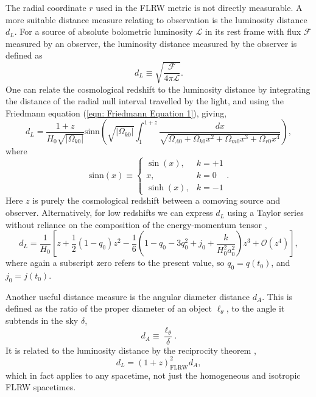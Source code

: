 \documentclass[a4paper,12pt]{report}
\begin{document}
The radial coordinate $r$ used in the FLRW metric is not directly measurable. A more suitable distance measure relating to observation is the luminosity distance $d_L$. For a source of absolute bolometric luminosity $\mathcal{L}$ in its rest frame with flux $\mathcal{F}$ measured by an observer, the luminosity distance measured by the observer is defined as
\begin{equation}
  d_L \equiv \sqrt{\frac{\mathcal{F}}{4\pi\mathcal{L}}}.
\end{equation}
One can relate the cosmological redshift to the luminosity distance by integrating the distance of the radial null interval travelled by the light, and using the Friedmann equation (\ref{eqn: Friedmann Equation 1}), giving,
\begin{equation}
  d_L = \frac{1+z}{H_0 \sqrt{|\Omega_{{k0}}|}}\text{sinn}\left(\sqrt{|\Omega_{{k0}}|} \int_1^{1+z} \frac{dx}{\sqrt{\Omega_{\Lambda 0} + \Omega_{k0}x^2 + \Omega_{m0}x^3 + \Omega_{r0}x^4}}\right),
\end{equation}
where
\begin{equation}
  \text{sinn}(x)\equiv \begin{cases}
    \sin (x), & k=+1 \\
    x, & k=0\\
    \sinh (x), & k=-1
\end{cases}.
\end{equation}
Here $z$ is purely the cosmological redshift between a comoving source and observer. Alternatively, for low redshifts we can express $d_L$ using a Taylor series without reliance on the composition of the energy-momentum tensor \cite{RN220},
\begin{equation} \label{eqn: standard model - d_L Taylor series}
  d_L=\frac{1}{H_0}\left[z + \frac{1}{2}(1-q_0)z^2-\frac{1}{6}(1-q_0-3q_0^2+j_0+\frac{k}{H_0^2 a_0^2})z^3+\mathcal{O}(z^4)\right],
\end{equation}
where again a subscript zero refers to the present value, so $q_0 = q(t_0)$, and $j_0 = j(t_0)$.

Another useful distance measure is the angular diameter distance $d_A$. This is defined as the ratio of the proper diameter of an object $\ell_\theta$, to the angle it subtends in the sky $\delta$,
\begin{equation}
  d_A \equiv \frac{\ell_\theta}{\delta}.
\end{equation}
It is related to the luminosity distance by the reciprocity theorem \cite{RN64,RN102},
\begin{equation}
  d_L = (1+z)_{\text{FLRW}}^2 d_A,
\end{equation}
which in fact applies to any spacetime, not just the homogeneous and isotropic FLRW spacetimes.
\end{document}
